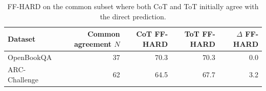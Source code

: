 \begin{table}[H]
\centering
\caption{FF-HARD on the common subset where both CoT and ToT initially agree with the direct prediction.}
\label{tab:paired-faithfulness}
\begin{tabular}{lrrrr}
\toprule
Dataset & Common agreement $N$ & CoT FF-HARD & ToT FF-HARD & $\Delta$ FF-HARD \\
\midrule
OpenBookQA & 37 & 70.3 & 70.3 & 0.0 \\
ARC-Challenge & 62 & 64.5 & 67.7 & 3.2 \\
\bottomrule
\end{tabular}
\end{table}
